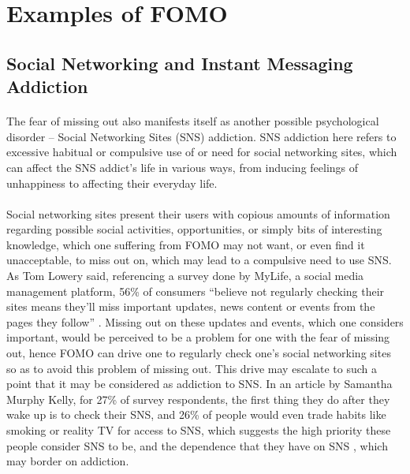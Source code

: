 \section{Examples of FOMO}
  \subsection{Social Networking and Instant Messaging Addiction}
    \paragraph{}
      The fear of missing out also manifests itself as another possible psychological disorder – Social Networking Sites (SNS) addiction. SNS addiction here refers to excessive habitual or compulsive use of or need for social networking sites, which can affect the SNS addict’s life in various ways, from inducing feelings of unhappiness to affecting their everyday life.
    \paragraph{}
      Social networking sites present their users with copious amounts of information regarding possible social activities, opportunities, or simply bits of interesting knowledge, which one suffering from FOMO may not want, or even find it unacceptable, to miss out on, which may lead to a compulsive need to use SNS. As Tom Lowery said, referencing a survey done by MyLife, a social media management platform, 56\% of consumers “believe not regularly checking their sites means they’ll miss important updates, news content or events from the pages they follow” \cite{lowery2013why}. Missing out on these updates and events, which one considers important, would be perceived to be a problem for one with the fear of missing out, hence FOMO can drive one to regularly check one’s social networking sites so as to avoid this problem of missing out. This drive may escalate to such a point that it may be considered as addiction to SNS. In an article by Samantha Murphy Kelly, for 27\% of survey respondents, the first thing they do after they wake up is to check their SNS, and 26\% of people would even trade habits like smoking or reality TV for access to SNS, which suggests the high priority these people consider SNS to be, and the dependence that they have on SNS \cite{kelly2013report} , which may border on addiction.
